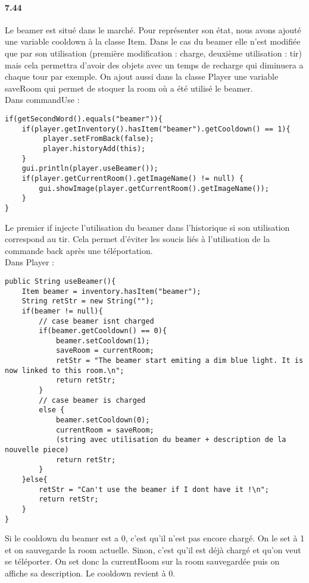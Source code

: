 \documentclass[11pt,a4paper]{report}
\begin{document}
\paragraph{7.44}
Le beamer est situé dans le marché. Pour représenter son état, nous avons ajouté une variable cooldown à la classe Item. Dans le cas du beamer elle n'est modifiée que par son utilisation (première modification : charge, deuxième utilisation : tir) mais cela permettra d'avoir des objets avec un temps de recharge qui diminuera a chaque tour par exemple. On ajout aussi dans la classe Player une variable saveRoom qui permet de stoquer la room où a été utilisé le beamer.\\
Dans commandUse :
\begin{lstlisting}
if(getSecondWord().equals("beamer")){
    if(player.getInventory().hasItem("beamer").getCooldown() == 1){
         player.setFromBack(false);
         player.historyAdd(this);
    }
    gui.println(player.useBeamer());
    if(player.getCurrentRoom().getImageName() != null) {
        gui.showImage(player.getCurrentRoom().getImageName());
    }
}
\end{lstlisting}
Le premier if injecte l'utilisation du beamer dans l'historique si son utilisation correspond au tir. Cela permet d'éviter les soucis liés à l'utilisation de la commande back après une téléportation. \\
Dans Player :
\begin{lstlisting}
public String useBeamer(){
    Item beamer = inventory.hasItem("beamer");
    String retStr = new String("");
    if(beamer != null){
        // case beamer isnt charged
        if(beamer.getCooldown() == 0){
            beamer.setCooldown(1);
            saveRoom = currentRoom;
            retStr = "The beamer start emiting a dim blue light. It is now linked to this room.\n";
            return retStr;
        }
        // case beamer is charged
        else {
            beamer.setCooldown(0);
            currentRoom = saveRoom;
            (string avec utilisation du beamer + description de la nouvelle piece)
            return retStr;
        }
    }else{
        retStr = "Can't use the beamer if I dont have it !\n";
        return retStr;
    }
}
\end{lstlisting}
Si le cooldown du beamer est a 0, c'est qu'il n'est pas encore chargé. On le set à 1 et on sauvegarde la room actuelle. Sinon, c'est qu'il est déjà chargé et qu'on veut se téléporter. On set donc la currentRoom sur la room sauvegardée puis on affiche sa description. Le cooldown revient à 0.
\end{document}
